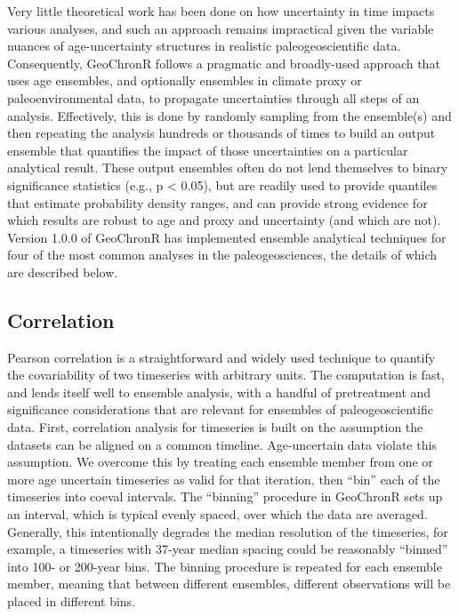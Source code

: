 \documentclass[gc, manuscript]{copernicus}
\begin{document}
Very little theoretical work has been done on how uncertainty in time impacts various analyses, and such an approach remains impractical given the variable nuances of age-uncertainty structures in realistic paleogeoscientific data.
Consequently, GeoChronR follows a pragmatic and broadly-used approach that uses age ensembles, and optionally ensembles in climate proxy or paleoenvironmental data, to propagate uncertainties through all steps of an analysis.
Effectively, this is done by randomly sampling from the ensemble(s) and then repeating the analysis hundreds or thousands of times to build an output ensemble that quantifies the impact of those uncertainties on a particular analytical result.
These output ensembles often do not lend themselves to binary significance statistics (e.g., p \textless{} 0.05), but are readily used to provide quantiles that estimate probability density ranges, and can provide strong evidence for which results are robust to age and proxy and uncertainty (and which are not).
Version 1.0.0 of GeoChronR has implemented ensemble analytical techniques for four of the most common analyses in the paleogeosciences, the details of which are described below.

\subsection{Correlation}

Pearson correlation is a straightforward and widely used technique to quantify the covariability of two timeseries with arbitrary units.
The computation is fast, and lends itself well to ensemble analysis, with a handful of pretreatment and significance considerations that are relevant for ensembles of paleogeoscientific data.
First, correlation analysis for timeseries is built on the assumption the datasets can be aligned on a common timeline.
Age-uncertain data violate this assumption.
We overcome this by treating each ensemble member from one or more age uncertain timeseries as valid for that iteration, then ``bin'' each of the timeseries into coeval intervals.
The ``binning'' procedure in GeoChronR sets up an interval, which is typical evenly spaced, over which the data are averaged.
Generally, this intentionally degrades the median resolution of the timeseries, for example, a timeseries with 37-year median spacing could be reasonably ``binned'' into 100- or 200-year bins.
The binning procedure is repeated for each ensemble member, meaning that between different ensembles, different observations will be placed in different bins.
\end{document}
